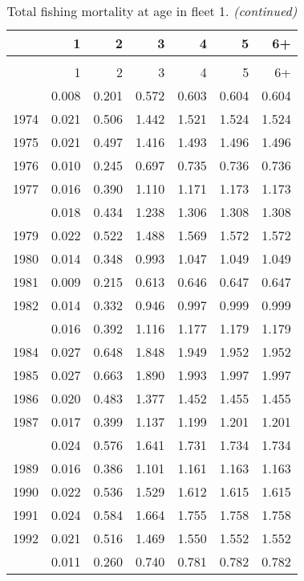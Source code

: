 \documentclass[
]{article}
\begin{document}
\begin{longtable}[t]{lrrrrrr}
\caption{\label{tab:fleet_1-fleet-FAA-table}Total fishing mortality at age in fleet 1.}\\
\toprule
  & 1 & 2 & 3 & 4 & 5 & 6+\\
\midrule
\endfirsthead
\caption[]{Total fishing mortality at age in fleet 1. \textit{(continued)}}\\
\toprule
  & 1 & 2 & 3 & 4 & 5 & 6+\\
\midrule
\endhead

\endfoot
\bottomrule
\endlastfoot
1973 & 0.008 & 0.201 & 0.572 & 0.603 & 0.604 & 0.604\\
1974 & 0.021 & 0.506 & 1.442 & 1.521 & 1.524 & 1.524\\
1975 & 0.021 & 0.497 & 1.416 & 1.493 & 1.496 & 1.496\\
1976 & 0.010 & 0.245 & 0.697 & 0.735 & 0.736 & 0.736\\
1977 & 0.016 & 0.390 & 1.110 & 1.171 & 1.173 & 1.173\\
\addlinespace
1978 & 0.018 & 0.434 & 1.238 & 1.306 & 1.308 & 1.308\\
1979 & 0.022 & 0.522 & 1.488 & 1.569 & 1.572 & 1.572\\
1980 & 0.014 & 0.348 & 0.993 & 1.047 & 1.049 & 1.049\\
1981 & 0.009 & 0.215 & 0.613 & 0.646 & 0.647 & 0.647\\
1982 & 0.014 & 0.332 & 0.946 & 0.997 & 0.999 & 0.999\\
\addlinespace
1983 & 0.016 & 0.392 & 1.116 & 1.177 & 1.179 & 1.179\\
1984 & 0.027 & 0.648 & 1.848 & 1.949 & 1.952 & 1.952\\
1985 & 0.027 & 0.663 & 1.890 & 1.993 & 1.997 & 1.997\\
1986 & 0.020 & 0.483 & 1.377 & 1.452 & 1.455 & 1.455\\
1987 & 0.017 & 0.399 & 1.137 & 1.199 & 1.201 & 1.201\\
\addlinespace
1988 & 0.024 & 0.576 & 1.641 & 1.731 & 1.734 & 1.734\\
1989 & 0.016 & 0.386 & 1.101 & 1.161 & 1.163 & 1.163\\
1990 & 0.022 & 0.536 & 1.529 & 1.612 & 1.615 & 1.615\\
1991 & 0.024 & 0.584 & 1.664 & 1.755 & 1.758 & 1.758\\
1992 & 0.021 & 0.516 & 1.469 & 1.550 & 1.552 & 1.552\\
\addlinespace
1993 & 0.011 & 0.260 & 0.740 & 0.781 & 0.782 & 0.782\\

\end{longtable}
\end{document}
